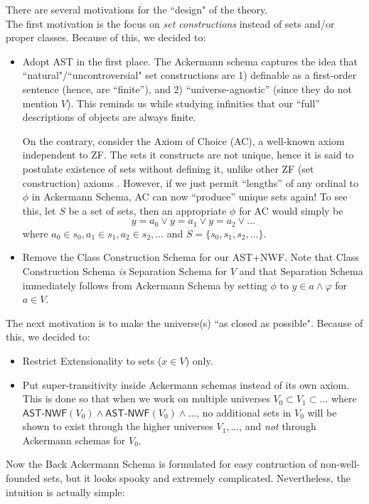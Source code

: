 \documentclass{article}
\begin{document}
There are several motivations for the ``design" of the theory.\\

The first motivation is the focus on \textit{set constructions} instead of sets and/or proper classes. Because of this, we decided to:
\begin{itemize}
\item Adopt AST in the first place. The Ackermann schema captures the idea that ``natural"/``uncontroversial" set constructions are 1) definable as a first-order sentence (hence, are ``finite''), and 2) ``universe-agnostic'' (since they do not mention $V$). This reminds us while studying infinities that our ``full'' descriptions of objects are always finite.

On the contrary, consider the Axiom of Choice (AC), a well-known axiom independent to ZF. The sets it constructs are not unique, hence it is said to postulate existence of sets without defining it, unlike other ZF (set construction) axioms \cite[Chapter 5]{jech}. However, if we just permit ``lengths'' of any ordinal to $\phi$ in Ackermann Schema, AC can now ``produce'' unique sets again! To see this, let $S$ be a set of sets, then an appropriate $\phi$ for AC would simply be $$y = a_0 \vee y = a_1 \vee y = a_2 \vee \ldots$$ where $a_0 \in s_0, a_1 \in s_1, a_2 \in s_2, \ldots$ and $S=\{s_0, s_1, s_2, \ldots\}$. 
\item Remove the Class Construction Schema for our \textsf{AST+NWF}. Note that Class Construction Schema \textit{is} Separation Schema for $V$ and that Separation Schema immediately follows from Ackermann Schema by setting $\phi$ to $y \in a \wedge \varphi$ for $a\in V$.
\end{itemize}

The next motivation is to make the universe(s) ``as closed as possible". Because of this, we decided to:
\begin{itemize}
\item Restrict Extensionality to sets ($x \in V$) only.
\item Put super-transitivity inside Ackermann schemas instead of its own axiom. This is done so that when we work on multiple universes $V_0 \subset V_1 \subset \ldots$ where $ \textsf{AST-NWF}(V_0) \wedge \textsf{AST-NWF}(V_0) \wedge\ldots$, no additional sets in $V_0$ will be shown to exist through the higher universes $V_1, \ldots$, and \textit{not} through Ackermann schemas for $V_0$.
\end{itemize}

Now the Back Ackermann Schema is formulated for easy contruction of non-well-founded sets, but it looks spooky and extremely complicated. Nevertheless, the intuition is actually simple:
\end{document}
